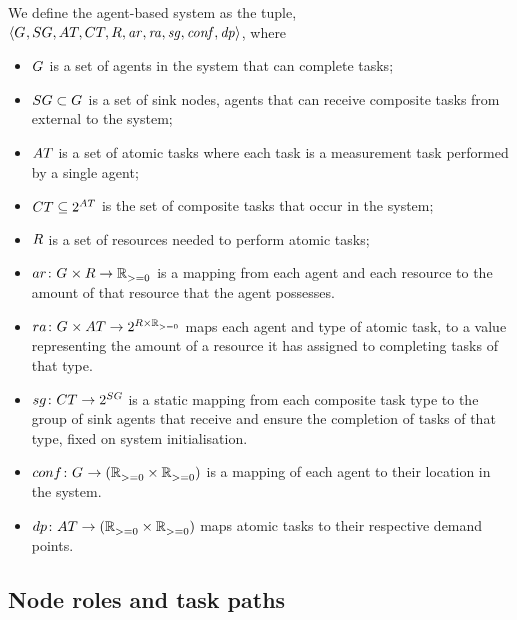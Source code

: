 We define the agent-based system as the tuple, $\langle 
	\setAgents{}{},
	\setSinkAgents{}{},
	\setAtomicTask{}{},
	\setCompositeTask{}{},
	\setResource{}{},
	\mathit{ar},
	\mathit{ra},
	\mathit{sg},
	\mathit{conf},
	\mathit{dp}
\rangle$, where
\begin{itemize}
	\item $G_{}^{}$ is a set of agents in the system that can complete tasks;
	\item $\setSinkAgents{}{} \subset \setAgents{}{}$ is a set of sink nodes, agents that can receive composite tasks from external to the system;
	\item $\setAtomicTask{}{}$ is a set of atomic tasks where each task is a measurement task performed by a single agent;
	\item $\setCompositeTask{}{} \subseteq \powerSetSymbol{\setAtomicTask{}{}}{}{}$ is the set of composite tasks that occur in the system;
	\item $\setResource{}{}$ is a set of resources needed to perform atomic tasks;
	  \item $\formalAgentResources{}{}$ is a mapping from each agent and each resource to the amount of that resource that the agent possesses.
	 \item $\formalTaskResourceAllocation{}{}$ maps each agent and type of atomic task, to a value representing the amount of a resource it has assigned to completing tasks of that type.
	\item $\formalSinkMapping{}{}$ is a static mapping from each composite task type to the group of sink agents that receive and ensure the completion of tasks of that type, fixed on system initialisation.
	\item $\formalDeployment{}{}$ is a mapping of each agent to their location in the system.
	\item  $\formalTaskDemandPoint{}{}$ maps atomic tasks to their respective demand points.
\end{itemize}

\subsection{Node roles and task paths}
\label{section:roles}

\newcommand{\formalSinkRole}[2]{
	\functionFormal{sink}
	{\setAtomicTask{}{}}
	{\setAgents{}{}}
}
\newcommand{\formalSenseRole}[2]{
	\functionFormal{sensor}
	{\setAtomicTask{}{}}
	{\setAgents{}{}}
}
\newcommand{\formalActiveRole}[2]{
	\functionFormal{active}
	{\setAtomicTask{}{}}
	{\powerSetAgents{}{}}
}
\newcommand{\formalIdleRole}[2]{
	\functionFormal{idle_{\setTime{}{}}}
	{\setAtomicTask{}{}}
	{\powerSetAgents{}{}}
}
\newcommand{\formalSleepRole}[2]{
	\functionFormal{sleep_{\setTime{}{}}}
	{\setAtomicTask{}{}}
	{\powerSetAgents{}{}}
}
\newcommand{\functionSinkRole}[2]{\functionSignature{sink}{\varAtomicTask{}{}}}
	
